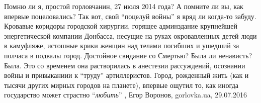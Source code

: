 Помню ли я, простой горловчанин, 27 июля 2014 года? А помните ли вы, как
впервые поцеловались? Так вот, свой \enquote{поцелуй войны} я вряд ли когда-то забуду.
Кровавые коридоры городской хирургии, горящее админздание крупнейшей
энергетической компании Донбасса, несущие на руках окровавленных детей люди в
камуфляже, истошные крики женщин над телами погибших и ушедший за полчаса в
подвалы город. Достойное свидание со Смертью? Была ли ненависть? Была. Это со
временем она растворилась в анестезии рассуждений, осознании войны и
привыканиии к \enquote{труду} артиллеристов. Город, рожденный жить (как и тысячи других
мирных городов на планете), впервые ощутил то, как иногда государство может
страстно \enquote{\emph{любить}}
, 
Егор Воронов, gorlovka.ua, 29.07.2016
